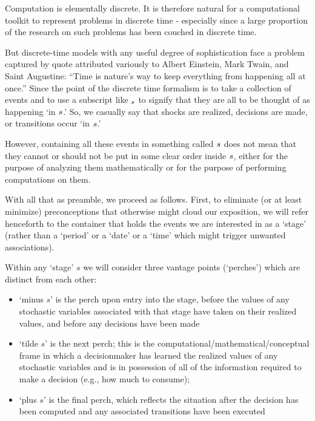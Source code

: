 \documentclass[\econtexRoot/BufferStockTheory]{subfiles}
\begin{document}
Computation is elementally discrete.  It is therefore natural for a computational toolkit to represent problems in discrete time - especially since a large proportion of the research on such problems has been couched in discrete time.

But discrete-time models with any useful degree of sophistication face a problem captured by quote attributed variously to Albert Einstein, Mark Twain, and Saint Augustine: ``Time is nature's way to keep everything from happening all at once.''  Since the point of the discrete time formalism is to take a collection of events and to use a subscript like $_\tnow$ to signify that they are all to be thought of as happening `in $\tnow$.'  So, we casually say that shocks are realized, decisions are made, or transitions occur `in $\tnow$.'

However, containing all these events in something called $\tnow$ does not mean that they cannot or should not be put in some clear order inside $\tnow$, either for the purpose of analyzing them mathematically or for the purpose of performing computations on them.

\newcommand{\stge}{{stage}}
With all that as preamble, we proceed as follows.  First, to eliminate (or at least minimize) preconceptions that otherwise might cloud our exposition, we will refer henceforth to the container that holds the events we are interested in as a `\stge' (rather than a `period' or a `date' or a `time' which might trigger unwanted associations).

\renewcommand{\tnow}{s}
Within any `\stge' $\tnow$ we will consider three vantage points (`perches') which are distinct from each other:
\begin{itemize}
\item[$-~\tnow$] `minus $\tnow$' is the perch upon entry into the {\stge}, before the values of any stochastic variables associated with that {\stge} have taken on their realized values, and before any decisions have been made
\item[$\sim{\tnow}$] `tilde $\tnow$' is the next perch; this is the computational/mathematical/conceptual frame in which a decisionmaker has learned the realized values of any stochastic variables and is in possession of all of the information required to make a decision (e.g., how much to consume);
\item[+~\tnow] `plus $\tnow$' is the final perch, which reflects the situation after the decision has been computed and any associated transitions have been executed
\end{itemize}
\end{document}
